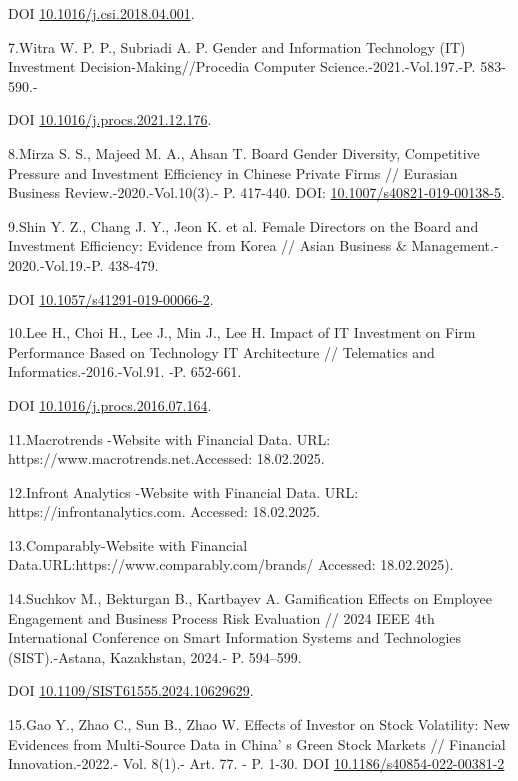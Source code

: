 {DOI
\href{http://dx.doi.org/10.1016/j.csi.2018.04.001}{10.1016/j.csi.2018.04.001}.

7.Witra W. P. P., Subriadi A. P. Gender and Information Technology (IT)
Investment Decision-Making//Procedia Computer Science.-2021.-Vol.197.-P.
583-590.-

DOI
\href{https://doi.org/10.1016/j.procs.2021.12.176}{10.1016/j.procs.2021.12.176}.

8.Mirza S. S., Majeed M. A., Ahsan T. Board Gender Diversity,
Competitive Pressure and Investment Efficiency in Chinese Private Firms
// Eurasian Business Review.-2020.-Vol.10(3).- P. 417-440. DOI:
\href{https://doi.org/10.1007/s40821-019-00138-5}{10.1007/s40821-019-00138-5}.

9.Shin Y. Z., Chang J. Y., Jeon K. et al. Female Directors on the Board
and Investment Efficiency: Evidence from Korea // Asian Business \&
Management.- 2020.-Vol.19.-P. 438-479.

DOI
\href{https://doi.org/10.1057/s41291-019-00066-2}{10.1057/s41291-019-00066-2}.

10.Lee H., Choi H., Lee J., Min J., Lee H. Impact of IT Investment on
Firm Performance Based on Technology IT Architecture // Telematics and
Informatics.-2016.-Vol.91. -P. 652-661.

DOI
\href{https://doi.org/10.1016/j.procs.2016.07.164}{10.1016/j.procs.2016.07.164}.

11.Macrotrends -Website with Financial Data. URL:
https://www.macrotrends.net.Accessed: 18.02.2025.

12.Infront Analytics -Website with Financial Data. URL:
https://infrontanalytics.com. Accessed: 18.02.2025.

13.Comparably-Website with Financial
Data.URL:https://www.comparably.com/brands/ Accessed: 18.02.2025).

14.Suchkov M., Bekturgan B., Kartbayev A. Gamification Effects on
Employee Engagement and Business Process Risk Evaluation // 2024 IEEE
4th International Conference on Smart Information Systems and
Technologies (SIST).-Astana, Kazakhstan, 2024.- P. 594--599.

DOI
\href{https://doi.org/10.1109/SIST61555.2024.10629629}{10.1109/SIST61555.2024.10629629}.

15.Gao Y., Zhao C., Sun B., Zhao W. Effects of Investor on Stock
Volatility: New Evidences from Multi-Source Data in
China' s Green Stock Markets // Financial
Innovation.-2022.- Vol. 8(1).- Art. 77. - P. 1-30. DOI
\href{https://doi.org/10.1186/s40854-022-00381-2}{10.1186/s40854-022-00381-2}

}
